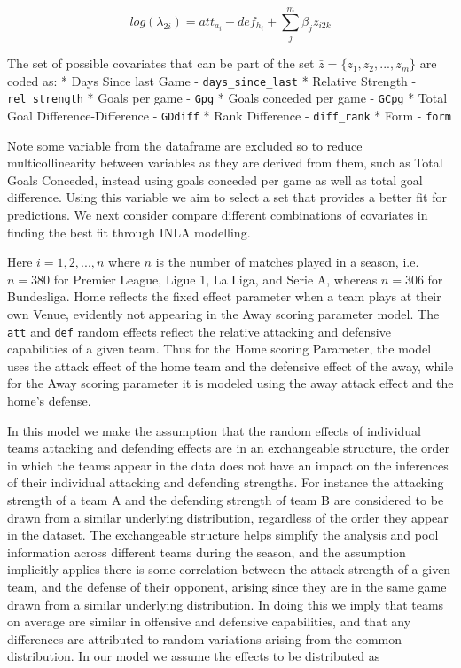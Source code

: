\documentclass[
]{article}
\begin{document}
\[log(\lambda_{2i}) = att_{a_i} + def_{h_i} + \sum^m_j\beta_jz_{i2k}\]

The set of possible covariates that can be part of the set
\(\bar{z}= \{ {z_1,z_2,...,z_m} \}\) are coded as: * Days Since last
Game - \texttt{days\_since\_last} * Relative Strength -
\texttt{rel\_strength} * Goals per game - \texttt{Gpg} * Goals conceded
per game - \texttt{GCpg} * Total Goal Difference-Difference -
\texttt{GDdiff} * Rank Difference - \texttt{diff\_rank} * Form -
\texttt{form}

Note some variable from the dataframe are excluded so to reduce
multicollinearity between variables as they are derived from them, such
as Total Goals Conceded, instead using goals conceded per game as well
as total goal difference. Using this variable we aim to select a set
that provides a better fit for predictions. We next consider compare
different combinations of covariates in finding the best fit through
INLA modelling.

Here \(i=1,2,...,n\) where \(n\) is the number of matches played in a
season, i.e.~\(n=380\) for Premier League, Ligue 1, La Liga, and Serie
A, whereas \(n = 306\) for Bundesliga. Home reflects the fixed effect
parameter when a team plays at their own Venue, evidently not appearing
in the Away scoring parameter model. The \texttt{att} and \texttt{def}
random effects reflect the relative attacking and defensive capabilities
of a given team. Thus for the Home scoring Parameter, the model uses the
attack effect of the home team and the defensive effect of the away,
while for the Away scoring parameter it is modeled using the away attack
effect and the home's defense.

In this model we make the assumption that the random effects of
individual teams attacking and defending effects are in an exchangeable
structure, the order in which the teams appear in the data does not have
an impact on the inferences of their individual attacking and defending
strengths. For instance the attacking strength of a team A and the
defending strength of team B are considered to be drawn from a similar
underlying distribution, regardless of the order they appear in the
dataset. The exchangeable structure helps simplify the analysis and pool
information across different teams during the season, and the assumption
implicitly applies there is some correlation between the attack strength
of a given team, and the defense of their opponent, arising since they
are in the same game drawn from a similar underlying distribution. In
doing this we imply that teams on average are similar in offensive and
defensive capabilities, and that any differences are attributed to
random variations arising from the common distribution. In our model we
assume the effects to be distributed as
\end{document}
